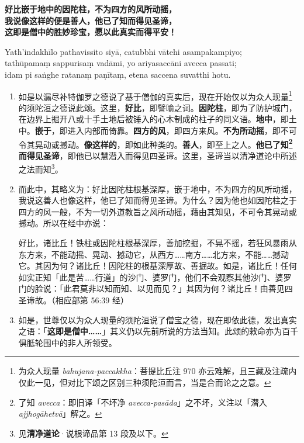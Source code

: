 \textbf{好比嵌于地中的因陀柱，不为四方的风所动摇，\\}
\textbf{我说像这样的便是善人，他已了知而得见圣谛，\\}
\textbf{这即是僧中的胜妙珍宝，愿以此真实而得平安！}

Yath’indakhīlo pathavissito siyā, catubbhi vātehi asampakampiyo;\\
tathūpamaṃ sappurisaṃ vadāmi, yo ariyasaccāni avecca passati;\\
idam pi saṅghe ratanaṃ paṇītaṃ, etena saccena suvatthi hotu. %

\begin{enumerate}\item 如是以漏尽补特伽罗之德说了基于僧伽的真实后，现在开始仅以为众人现量\footnote{为众人现量 \textit{bahujana-paccakkha}：菩提比丘注 970 亦云难解，且三藏及注疏内仅此一见，但对比下颂之区别三种须陀洹而言，当是合而论之之意。}的须陀洹之德说此颂。这里，\textbf{好比}，即譬喻之词。\textbf{因陀柱}，即为了防护城门，在边界上掘开八或十手土地后被锤入的心木制成的柱子的同义语。\textbf{地中}，即土中。\textbf{嵌于}，即进入内部而倚靠。\textbf{四方的风}，即四方来风。\textbf{不为所动摇}，即不可令其晃动或撼动。\textbf{像这样的}，即如此种类的。\textbf{善人}，即至上之人。\textbf{他已了知\footnote{了知 \textit{avecca}：即旧译「不坏净 \textit{avecca-pasāda}」之不坏，义注以「潜入 \textit{ajjhogāhetvā}」解之。}而得见圣谛}，即他已以慧潜入而得见四圣谛。这里，圣谛当以清净道论中所述之法而知\footnote{见\textbf{清净道论}·说根谛品第 13 段及以下。}。
\item 而此中，其略义为：好比因陀柱根基深厚，嵌于地中，不为四方的风所动摇，我说这善人也像这样，他已了知而得见圣谛。为什么？因为他也如因陀柱之于四方的风一般，不为一切外道教旨之风所动摇，藉由其知见，不可令其晃动或撼动。所以在经中亦说：\begin{quoting}好比，诸比丘！铁柱或因陀柱根基深厚，善加挖掘，不晃不摇，若狂风暴雨从东方来，不能动摇、晃动、撼动它，从西方……南方……北方来，不能……撼动它。其因为何？诸比丘！因陀柱的根基深厚故、善掘故。如是，诸比丘！任何如实正知「此是苦……行道」的沙门、婆罗门，他们不会观察其他沙门、婆罗门的脸说：「此君莫非以知而知、以见而见？」其因为何？诸比丘！由善见四圣谛故。（相应部第 56:39 经）\end{quoting}
\item 如是，世尊仅以为众人现量的须陀洹说了僧宝之德，现在即依此德，发出真实之语：「\textbf{这即是僧中……}」其义仍以先前所说的方法当知。此颂的敕命亦为百千俱胝轮围中的非人所领受。\end{enumerate}

